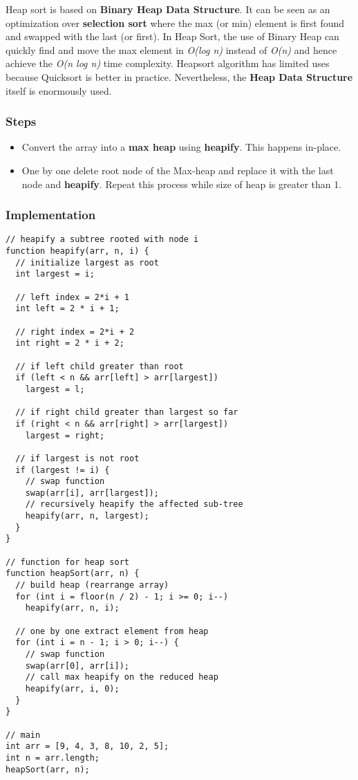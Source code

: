 Heap sort is based on \textbf{Binary Heap Data Structure}. It can be seen as an optimization over \textbf{selection sort} where the max (or min) element is first found and swapped with the last (or first). In Heap Sort, the use of Binary Heap can quickly find and move the max element in \textit{O(log n)} instead of \textit{O(n)} and hence achieve the \textit{O(n log n)} time complexity. Heapsort algorithm has limited uses because Quicksort is better in practice. Nevertheless, the \textbf{Heap Data Structure} itself is enormously used.

\subsubsection*{Steps}

\begin{itemize}
  \item Convert the array into a \textbf{max heap} using \textbf{heapify}. This happens in-place.
  \item One by one delete root node of the Max-heap and replace it with the last node and \textbf{heapify}. Repeat this process while size of heap is greater than 1.
\end{itemize}

\subsubsection*{Implementation}

\begin{lstlisting}[style=general]
// heapify a subtree rooted with node i
function heapify(arr, n, i) {
  // initialize largest as root
  int largest = i;

  // left index = 2*i + 1
  int left = 2 * i + 1;

  // right index = 2*i + 2
  int right = 2 * i + 2;

  // if left child greater than root
  if (left < n && arr[left] > arr[largest])
    largest = l;

  // if right child greater than largest so far
  if (right < n && arr[right] > arr[largest])
    largest = right;

  // if largest is not root
  if (largest != i) {
    // swap function
    swap(arr[i], arr[largest]);
    // recursively heapify the affected sub-tree
    heapify(arr, n, largest);
  }
}

// function for heap sort
function heapSort(arr, n) {
  // build heap (rearrange array)
  for (int i = floor(n / 2) - 1; i >= 0; i--)
    heapify(arr, n, i);

  // one by one extract element from heap
  for (int i = n - 1; i > 0; i--) {
    // swap function
    swap(arr[0], arr[i]);
    // call max heapify on the reduced heap
    heapify(arr, i, 0);
  }
}

// main
int arr = [9, 4, 3, 8, 10, 2, 5];
int n = arr.length;
heapSort(arr, n);
\end{lstlisting}

